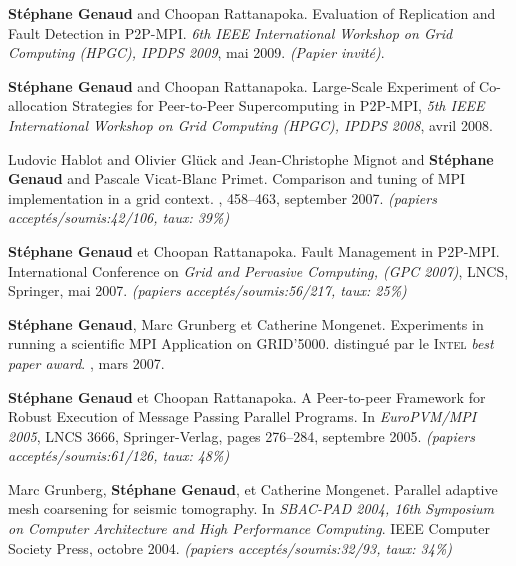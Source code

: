 \documentclass[11pt]{article}
\newcommand{\pmpi}{\mbox{\textsc{P2P-MPI}}}
\begin{document}
\begin{thebibliography}{99}
\textbf{Stéphane Genaud} and Choopan Rattanapoka.
\newblock Evaluation of Replication and Fault Detection in P2P-MPI.
\newblock 
{\em 6th IEEE International Workshop on Grid Computing (HPGC), IPDPS 2009}, 
mai 2009.
\newblock \textit{(Papier invité)}.

\textbf{Stéphane Genaud} and Choopan Rattanapoka. 
\newblock Large-Scale Experiment of Co-allocation Strategies for Peer-to-Peer 
Supercomputing in P2P-MPI,
\newblock 
{\em 5th IEEE International Workshop on Grid Computing (HPGC), IPDPS 2008}, 
avril 2008.

Ludovic Hablot and Olivier Glück and Jean-Christophe Mignot and \textbf{Stéphane Genaud} and Pascale Vicat-Blanc Primet.
\newblock Comparison and tuning of MPI implementation in a grid context.
, 458--463, september 2007.
\newblock \small{\textit{(papiers acceptés/soumis:42/106, taux: 39\%)}}

\newblock \textbf{Stéphane Genaud} et Choopan Rattanapoka.
\newblock Fault Management in {\pmpi}. 
\newblock International Conference on {\em Grid and Pervasive Computing, 
(GPC 2007)}, LNCS, Springer, mai 2007.
\newblock \small{\textit{(papiers acceptés/soumis:56/217, taux: 25\%)}}

\newblock \textbf{Stéphane Genaud}, Marc Grunberg et Catherine Mongenet.
\newblock Experiments in running a scientific {MPI} Application on GRID'5000. 
\newblock distingué par le \textsc{Intel} \textit{best paper award}.
, mars 2007.


\textbf{Stéphane Genaud} et Choopan Rattanapoka.
\newblock A Peer-to-peer Framework for Robust Execution of Message Passing 
Parallel Programs.
\newblock 
In {\em EuroPVM/MPI 2005}, LNCS 3666, Springer-Verlag, pages 276--284, 
septembre 2005.
\newblock \small{\textit{(papiers acceptés/soumis:61/126, taux: 48\%)}}


Marc Grunberg, \textbf{Stéphane Genaud}, et Catherine Mongenet.
\newblock Parallel adaptive mesh coarsening for seismic tomography.
\newblock In {\em SBAC-PAD 2004, 16th Symposium on Computer Architecture and
  High Performance Computing}. IEEE Computer Society Press, octobre 2004.
\newblock \small{\textit{(papiers acceptés/soumis:32/93, taux: 34\%)}}


\end{thebibliography}
\end{document}
